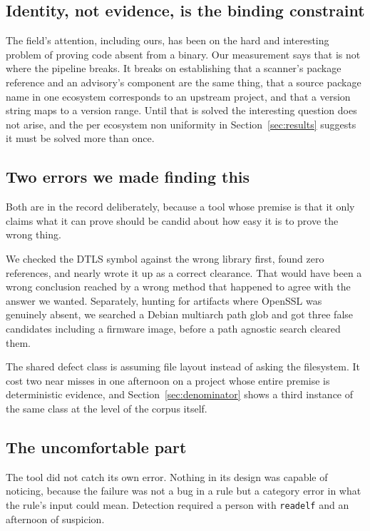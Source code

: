 \subsection{Identity, not evidence, is the binding constraint}

The field's attention, including ours, has been on the hard and interesting
problem of proving code absent from a binary. Our measurement says that is not
where the pipeline breaks. It breaks on establishing that a scanner's package
reference and an advisory's component are the same thing, that a source package
name in one ecosystem corresponds to an upstream project, and that a version
string maps to a version range. Until that is solved the interesting question
does not arise, and the per ecosystem non uniformity in
Section~\ref{sec:results} suggests it must be solved more than once.

\subsection{Two errors we made finding this}

Both are in the record deliberately, because a tool whose premise is that it only
claims what it can prove should be candid about how easy it is to prove the wrong
thing.

We checked the DTLS symbol against the wrong library first, found zero
references, and nearly wrote it up as a correct clearance. That would have been a
wrong conclusion reached by a wrong method that happened to agree with the answer
we wanted. Separately, hunting for artifacts where OpenSSL was genuinely absent,
we searched a Debian multiarch path glob and got three false candidates including
a firmware image, before a path agnostic search cleared them.

The shared defect class is assuming file layout instead of asking the filesystem.
It cost two near misses in one afternoon on a project whose entire premise is
deterministic evidence, and Section~\ref{sec:denominator} shows a third instance
of the same class at the level of the corpus itself.

\subsection{The uncomfortable part}

The tool did not catch its own error. Nothing in its design was capable of
noticing, because the failure was not a bug in a rule but a category error in
what the rule's input could mean. Detection required a person with
\texttt{readelf} and an afternoon of suspicion.

